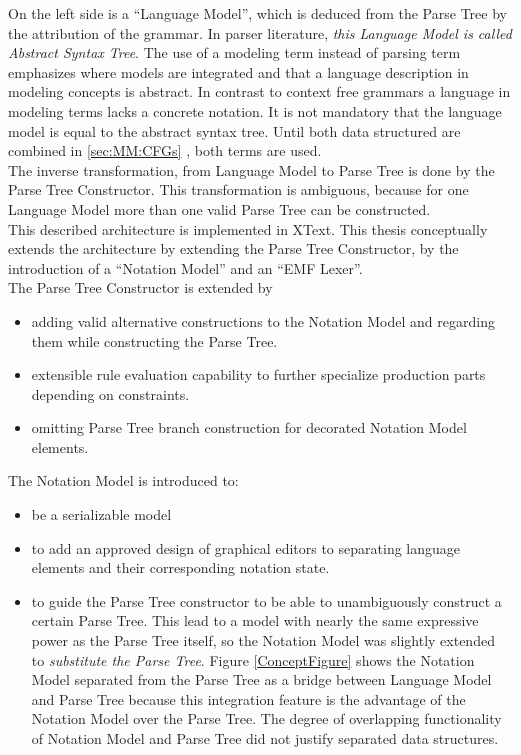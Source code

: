 On the left side is a ``Language Model'', which is deduced from the Parse Tree by the attribution of the grammar. In parser literature, \emph{this Language Model is called Abstract Syntax Tree}. The use of a modeling term instead of parsing term emphasizes where models are integrated and that a language description in modeling concepts is abstract. In contrast to context free grammars a language in modeling terms lacks a concrete notation. It is not mandatory that the language model is equal to the abstract syntax tree. Until both data structured are combined in \ref{sec:MM:CFGs} , both terms are used. \\
The inverse transformation, from Language Model to Parse Tree is done by the Parse Tree Constructor. This transformation is ambiguous, because for one Language Model more than one valid Parse Tree can be constructed. \\
This described architecture is implemented in XText. This thesis conceptually extends the architecture by extending the Parse Tree Constructor, by the introduction of a ``Notation Model'' and an ``EMF Lexer''.\\
The Parse Tree Constructor is extended by 
\begin{itemize}
	\item adding valid alternative constructions to the Notation Model and regarding them while constructing the Parse Tree. 
	\item extensible rule evaluation capability to further specialize production parts depending on constraints.
	\item omitting Parse Tree branch construction for decorated Notation Model elements.
\end{itemize}
The Notation Model is introduced to:
\begin{itemize}
	\item be a serializable model
	\item to add an approved design of graphical editors to separating language elements and their corresponding notation state.
	\item to guide the Parse Tree constructor to be able to unambiguously construct a certain Parse Tree. This lead to a model with nearly the same expressive power as the Parse Tree itself, so the Notation Model was slightly extended to \emph{substitute the Parse Tree}. Figure \ref{ConceptFigure} shows the Notation Model separated from the Parse Tree as a bridge between Language Model and Parse Tree because this integration feature is the advantage of the Notation Model over the Parse Tree. The degree of overlapping functionality of Notation Model and Parse Tree did not justify separated data structures.
\end{itemize} 
